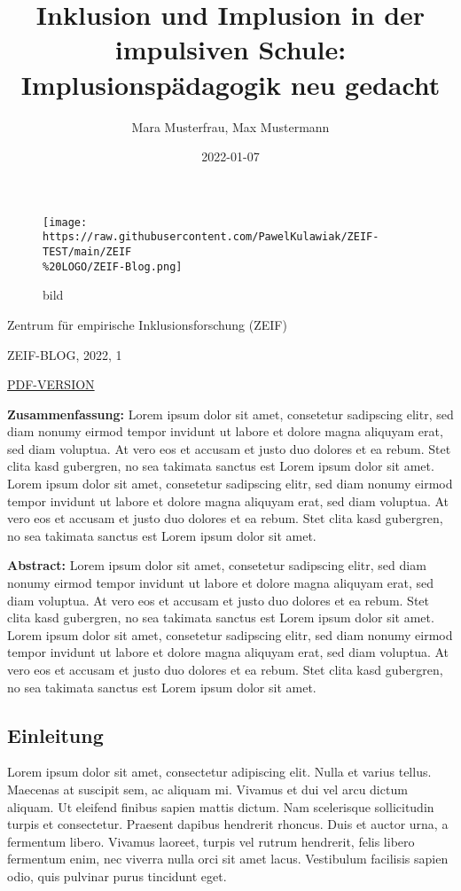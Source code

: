 \documentclass[
]{article}
\title{Inklusion und Implusion in der impulsiven Schule:
Implusionspädagogik neu gedacht}
\author{Mara Musterfrau, Max Mustermann}
\date{2022-01-07}
\begin{document}
\maketitle

\begin{figure}
\centering
\texttt{[image: https://raw.githubusercontent.com/PawelKulawiak/ZEIF-TEST/main/ZEIF\\\%20LOGO/ZEIF-Blog.png]}
\caption{bild}
\end{figure}

Zentrum für empirische Inklusionsforschung (ZEIF)

ZEIF-BLOG, 2022, 1

\href{https://github.com/PawelKulawiak/ZEIF-TEST/raw/main/PDF/2022_1_musterfrau.pdf}{PDF-VERSION}

\textbf{Zusammenfassung:} Lorem ipsum dolor sit amet, consetetur
sadipscing elitr, sed diam nonumy eirmod tempor invidunt ut labore et
dolore magna aliquyam erat, sed diam voluptua. At vero eos et accusam et
justo duo dolores et ea rebum. Stet clita kasd gubergren, no sea
takimata sanctus est Lorem ipsum dolor sit amet. Lorem ipsum dolor sit
amet, consetetur sadipscing elitr, sed diam nonumy eirmod tempor
invidunt ut labore et dolore magna aliquyam erat, sed diam voluptua. At
vero eos et accusam et justo duo dolores et ea rebum. Stet clita kasd
gubergren, no sea takimata sanctus est Lorem ipsum dolor sit amet.

\textbf{Abstract:} Lorem ipsum dolor sit amet, consetetur sadipscing
elitr, sed diam nonumy eirmod tempor invidunt ut labore et dolore magna
aliquyam erat, sed diam voluptua. At vero eos et accusam et justo duo
dolores et ea rebum. Stet clita kasd gubergren, no sea takimata sanctus
est Lorem ipsum dolor sit amet. Lorem ipsum dolor sit amet, consetetur
sadipscing elitr, sed diam nonumy eirmod tempor invidunt ut labore et
dolore magna aliquyam erat, sed diam voluptua. At vero eos et accusam et
justo duo dolores et ea rebum. Stet clita kasd gubergren, no sea
takimata sanctus est Lorem ipsum dolor sit amet.

\hypertarget{einleitung}{%
\subsection{Einleitung}\label{einleitung}}

Lorem ipsum dolor sit amet, consectetur adipiscing elit. Nulla et varius
tellus. Maecenas at suscipit sem, ac aliquam mi. Vivamus et dui vel arcu
dictum aliquam. Ut eleifend finibus sapien mattis dictum. Nam
scelerisque sollicitudin turpis et consectetur. Praesent dapibus
hendrerit rhoncus. Duis et auctor urna, a fermentum libero. Vivamus
laoreet, turpis vel rutrum hendrerit, felis libero fermentum enim, nec
viverra nulla orci sit amet lacus. Vestibulum facilisis sapien odio,
quis pulvinar purus tincidunt eget.
\end{document}
